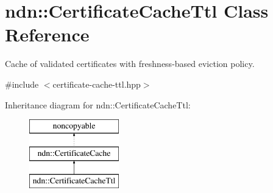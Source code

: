 \hypertarget{classndn_1_1CertificateCacheTtl}{}\section{ndn\+:\+:Certificate\+Cache\+Ttl Class Reference}
\label{classndn_1_1CertificateCacheTtl}


Cache of validated certificates with freshness-\/based eviction policy.  




{\ttfamily \#include $<$certificate-\/cache-\/ttl.\+hpp$>$}

Inheritance diagram for ndn\+:\+:Certificate\+Cache\+Ttl\+:\begin{figure}[H]
\begin{center}
\leavevmode
\includegraphics[height=3.000000cm]{classndn_1_1CertificateCacheTtl}
\end{center}
\end{figure}
